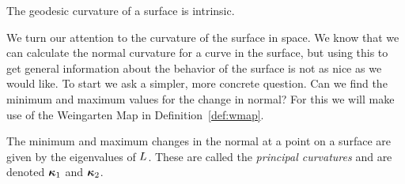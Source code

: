   \begin{prop}
    The geodesic curvature of a surface is intrinsic.
  \end{prop}




  We turn our attention to the curvature of the surface in space. We know that we can calculate the normal curvature for a curve in the surface, but using this to get general information about the behavior of the surface is not as nice as we would like. To start we ask a simpler, more concrete question. Can we find the minimum and maximum values for the change in normal? For this we will make use of the Weingarten Map in Definition~\ref{def:wmap}.

  \begin{prop}
    The minimum and maximum changes in the normal at a point on a surface are given by the eigenvalues of $L$. These are called the \emph{principal curvatures} and are denoted $\boldsymbol{\kappa}_1$ and $\boldsymbol{\kappa}_2$.
  \end{prop}

